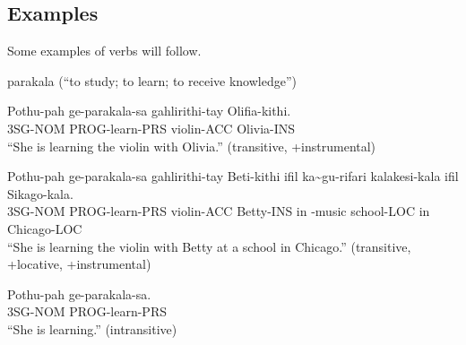 \subsection{Examples}
Some examples of verbs will follow.

parakala (``to study; to learn; to receive knowledge'')

\begin{exe}
    \ex{} \gll{}Pothu-pah ge-parakala-sa gahlirithi-tay Olifia-kithi.\\
                3SG-NOM   PROG-learn-PRS violin-ACC Olivia-INS\\
        \glt{}``She is learning the violin with Olivia.'' (transitive, +instrumental)
\end{exe}

\begin{exe}
    \ex{} \gll{}Pothu-pah ge-parakala-sa gahlirithi-tay Beti-kithi ifil ka\~{}gu-rifari kalakesi-kala ifil Sikago-kala.\\
                3SG-NOM   PROG-learn-PRS violin-ACC Betty-INS in \agradj{}-music school-LOC in Chicago-LOC\\
        \glt{}``She is learning the violin with Betty at a school in Chicago.'' (transitive, +locative, +instrumental)
\end{exe}

\begin{exe}
    \ex{} \gll{}Pothu-pah ge-parakala-sa.\\
                3SG-NOM   PROG-learn-PRS\\
        \glt{}``She is learning.'' (intransitive)
\end{exe}
